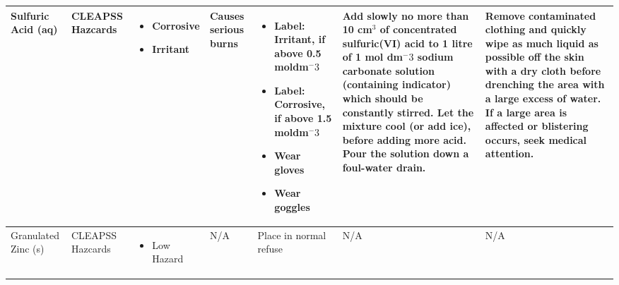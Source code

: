 \begin{landscape}
\begin{center}
\begin{longtable}{|p{1.5cm}|p{1.5cm}|p{3cm}|p{3cm}|p{3cm}|p{3cm}|p{2cm}|}
Sulfuric Acid (aq) &
CLEAPSS Hazcards &
\begin{itemize}
\item Corrosive
\item Irritant \end{itemize} &
Causes serious burns & 
\begin{itemize}
\item Label: Irritant, if above 0.5 moldm$^-3$
\item Label: Corrosive, if above 1.5 moldm$^-3$
\item Wear gloves
\item Wear goggles \end{itemize} &
Add slowly no more than 10 cm$^3$ of concentrated sulfuric(VI) acid to 1 litre of 1 mol dm$^-3$ sodium carbonate solution (containing indicator) which should be constantly stirred. Let the mixture cool (or add ice), before adding more acid. Pour the solution down a foul-water drain. & 
Remove contaminated clothing and quickly wipe as much liquid as possible off the skin with a dry cloth before drenching the area with a large excess of water. If a large area is affected or blistering occurs, seek medical attention. \\ \hline

Granulated Zinc (s) &
CLEAPSS Hazcards &
\begin{itemize}
\item Low Hazard \end{itemize} &
N/A &
Place in normal refuse &
N/A &
N/A \\ \hline

\end{longtable}
\label{tab:Risk Assessment Table}

\end{center}


\end{landscape}




